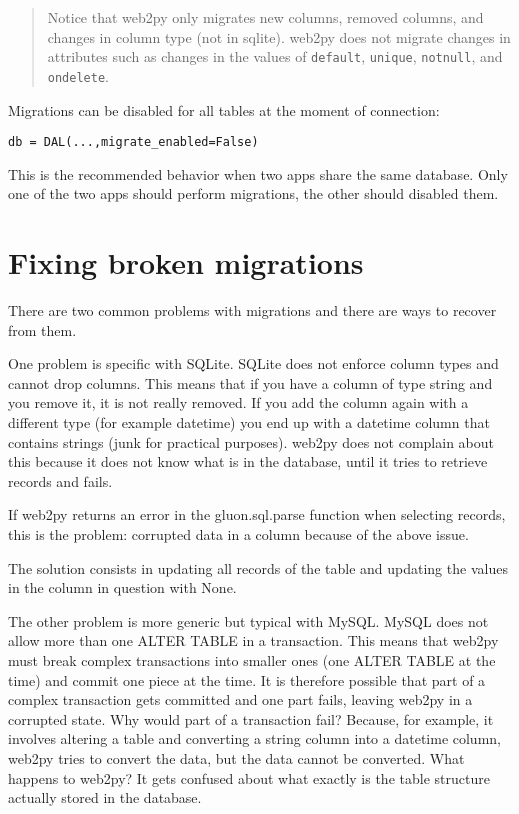 \documentclass[justified,sixbynine,notoc]{tufte-book}
\def\ft{\small\tt}
\def\inxx#1{\index{#1}}
\begin{document}
\begin{fullwidth}
\begin{quote}Notice that web2py only migrates new columns, removed columns, and changes in column type (not in sqlite). web2py does not migrate changes in attributes such as changes in the values of {\ft default}, {\ft unique}, {\ft notnull}, and {\ft ondelete}.\end{quote}
Migrations can be disabled for all tables at the moment of connection:

\begin{lstlisting}
db = DAL(...,migrate_enabled=False)
\end{lstlisting}

This is the recommended behavior when two apps share the same database. Only one of the two apps should perform migrations, the other should disabled them.

\goodbreak\section{Fixing broken migrations}

\inxx{fake\_migrate}

There are two common problems with migrations and there are ways to recover from them.

One problem is specific with SQLite. SQLite does not enforce column types and cannot drop columns. This means that if you have a column of type string and you remove it, it is not really removed. If you add the column again with a different type (for example datetime) you end up with a datetime column that contains strings (junk for practical purposes). web2py does not complain about this because it does not know what is in the database, until it tries to retrieve records and fails.

If web2py returns an error in the gluon.sql.parse function when selecting records, this is the problem: corrupted data in a column because of the above issue.

The solution consists in updating all records of the table and updating the values in the column in question with None.

The other problem is more generic but typical with MySQL. MySQL does not allow more than one ALTER TABLE in a transaction. This means that web2py must break complex transactions into smaller ones (one ALTER TABLE at the time) and commit one piece at the time. It is therefore possible that part of a complex transaction gets committed and one part fails, leaving web2py in a corrupted state. Why would part of a transaction fail? Because, for example, it involves altering a table and converting a string column into a datetime column, web2py tries to convert the data, but the data cannot be converted. What happens to web2py? It gets confused about what exactly is the table structure actually stored in the database.


\end{fullwidth}
\end{document}
